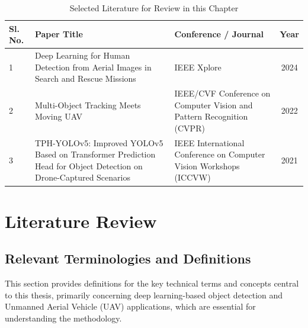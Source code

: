 \documentclass[12pt, a4paper]{report}
\begin{document}
\begin{table}[H]
    \centering
    \caption{Selected Literature for Review in this Chapter}
    \label{tab:selected_literature}
    \begin{tabular}{|p{0.8cm}|p{7cm}|p{5cm}|c|}
    \hline
    \textbf{Sl. No.} & \textbf{Paper Title} & \textbf{Conference / Journal} & \textbf{Year} \\ \hline
    1 & Deep Learning for Human Detection from Aerial Images in Search and Rescue Missions & IEEE Xplore & 2024 \\ \hline
    2 & Multi-Object Tracking Meets Moving UAV & IEEE/CVF Conference on Computer Vision and Pattern Recognition (CVPR) & 2022 \\ \hline
    3 & TPH-YOLOv5: Improved YOLOv5 Based on Transformer Prediction Head for Object Detection on Drone-Captured Scenarios & IEEE International Conference on Computer Vision Workshops (ICCVW) & 2021 \\ \hline
    \end{tabular}
\end{table}

\section{Literature Review}

\subsection{Relevant Terminologies and Definitions}
This section provides definitions for the key technical terms and concepts central to this thesis, primarily concerning deep learning-based object detection and Unmanned Aerial Vehicle (UAV) applications, which are essential for understanding the methodology.
\end{document}
